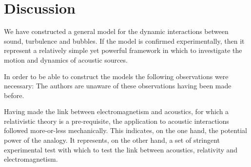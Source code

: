 \section{Discussion}\label{sec:discussion}

We have constructed a general model for the dynamic interactions between sound, turbulence and bubbles.
If the model is confirmed experimentally,
then it represent a  relatively simple yet powerful framework in which to investigate the motion and dynamics of acoustic sources.

In order to be able to construct the models the following observations were necessary:
The authors are unaware of these observations having been made before.

Having made the link between electromagnetism and acoustics, 
for which a relativistic theory is  a pre-requisite,
the application to acoustic interactions followed more-or-less mechanically.
This indicates, on the one hand, the potential power of the analogy.
It represents, on the other hand, a set of stringent experimental test with which to test the link between acoustics, relativity and electromagnetism.


